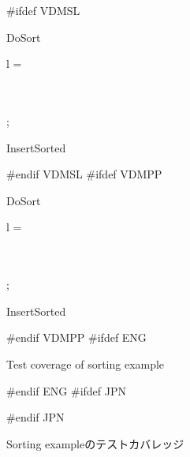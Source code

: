 \documentclass[\pformat,12pt]{article}
\begin{document}
\begin{figure}[tbh]
#ifdef VDMSL
\small{
\begin{vdm}
\begin{fn}[e]{DoSort}%
\signature{\seqof*{\Real } \To \seqof*{\Real }}
\If l = \seq{}
\Then\\ \seq{}
\Else\\ \begin{letexpr}
\end{letexpr}\\
\Fi;
\end{fn}

\begin{fn}[e]{InsertSorted}%
\signature{PosReal \times {} \To {}}
\begin{Cases}{\True }
\end{Cases}
\end{fn}
\end{vdm}}
#endif VDMSL
#ifdef VDMPP
\small{
\begin{vdm}
\begin{fn}[e]{DoSort}%
\signature{\seqof*{\Real } \To \seqof*{\Real }}
\If l = \seq{}
\Then\\ \seq{}
\Else\\ \begin{letexpr}
\end{letexpr}\\
\Fi;\\
\end{fn}
\begin{fn}[e]{InsertSorted}%
\signature{PosReal \times {} \To {}}
\begin{Cases}{\True }
\end{Cases}
\end{fn}
\end{vdm}}
#endif VDMPP
#ifdef ENG
\caption{Test coverage of sorting example}
#endif ENG
#ifdef JPN
\caption{Sorting exampleのテストカバレッジ}
#endif JPN
\label{fig:tc-sort}
\end{figure}
\end{document}
